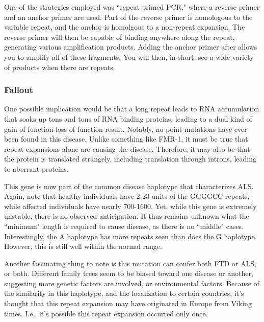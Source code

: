 \documentclass[12pt]{report}
\begin{document}
One of the strategies employed was ``repeat primed PCR," where a reverse primer and an anchor primer are used. Part of the reverse primer is homologous to the variable repeat, and the anchor is homolgous to a non-repeat expansion. The reverse primer will then be capable of binding anywhere along the repeat, generating various amplification products. Adding the anchor primer after allows you to amplify all of these fragments. You will then, in short, see a wide variety of products when there are repeats. 

\subsubsection{Fallout}

One possible implication would be that a long repeat leads to RNA accumulation that soaks up tons and tons of RNA binding proteins, leading to a dual kind of gain of function-loss of function result. Notably, no point mutations have ever been found in this disease. Unlike something like FMR-1, it must be true that repeat expansions alone are causing the disease. Therefore, it may also be that the protein is translated strangely, including translation through introns, leading to aberrant proteins.\newline

This gene is now part of the common disease haplotype that characterizes ALS. Again, note that healthy individuals have 2-23 units of the GGGGCC repeats, while affected individuals have nearly 700-1600. Yet, while this gene is extremely unstable, there is no observed anticipation. It thus remains unknown what the ``minimum" length is required to cause disease, as there is no ``middle" cases. Interestingly, the A haplotype has more repeats seen than does the G haplotype. However, this is still well within the normal range.\newline

Another fascinating thing to note is this mutation can confer both FTD or ALS, or both. Different family trees seem to be biased toward one disease or another, suggesting more genetic factors are involved, or environmental factors. Because of the similarity in this haplotype, and the localization to certain countries, it's thought that this repeat expansion may have originated in Europe from Viking times. I.e., it's possible this repeat expansion occurred only once. 

 
\end{document}
